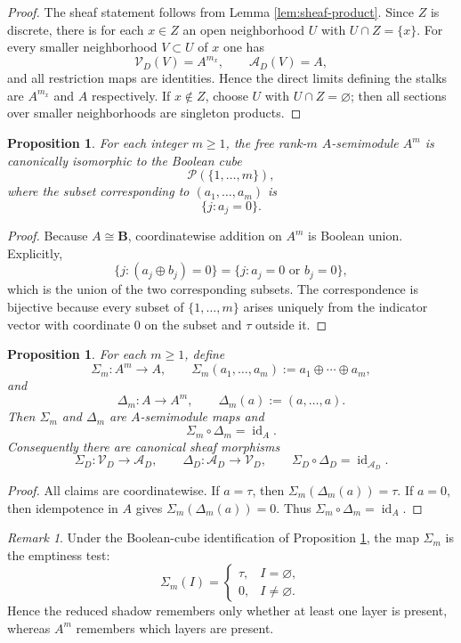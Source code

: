 \documentclass[11pt,a4paper]{article}
\newtheorem{proposition}[theorem]{Proposition}
\theoremstyle{definition}
\theoremstyle{remark}
\newtheorem{remark}[theorem]{Remark}
\newcommand{\BB}{\mathbf B}
\newcommand{\cP}{\mathcal P}
\newcommand{\taup}{\tau}
\begin{document}
\begin{proof}
The sheaf statement follows from Lemma \ref{lem:sheaf-product}.  Since $Z$ is discrete, there is for each $x\in Z$ an open neighborhood $U$ with $U\cap Z=\{x\}$.  For every smaller neighborhood $V\subset U$ of $x$ one has
\[
\mathcal V_D(V)=A^{m_x},
\qquad
\mathcal A_D(V)=A,
\]
and all restriction maps are identities.  Hence the direct limits defining the stalks are $A^{m_x}$ and $A$ respectively.  If $x\notin Z$, choose $U$ with $U\cap Z=\varnothing$; then all sections over smaller neighborhoods are singleton products.
\end{proof}

\begin{proposition}\label{prop:boolean-cube}
For each integer $m\ge1$, the free rank-$m$ $A$-semimodule $A^m$ is canonically isomorphic to the Boolean cube
\[
\cP(\{1,\dots,m\}),
\]
where the subset corresponding to $(a_1,\dots,a_m)$ is
\[
\{j:a_j=0\}.
\]
\end{proposition}

\begin{proof}
Because $A\cong\BB$, coordinatewise addition on $A^m$ is Boolean union.  Explicitly,
\[
\{j:(a_j\oplus b_j)=0\}=\{j:a_j=0\text{ or }b_j=0\},
\]
which is the union of the two corresponding subsets.  The correspondence is bijective because every subset of $\{1,\dots,m\}$ arises uniquely from the indicator vector with coordinate $0$ on the subset and $\taup$ outside it.
\end{proof}

\begin{proposition}\label{prop:retract}
For each $m\ge1$, define
\[
\Sigma_m:A^m\to A,
\qquad
\Sigma_m(a_1,\dots,a_m):=a_1\oplus\cdots\oplus a_m,
\]
and
\[
\Delta_m:A\to A^m,
\qquad
\Delta_m(a):=(a,\dots,a).
\]
Then $\Sigma_m$ and $\Delta_m$ are $A$-semimodule maps and
\[
\Sigma_m\circ \Delta_m=\operatorname{id}_A.
\]
Consequently there are canonical sheaf morphisms
\[
\Sigma_D:\mathcal V_D\to\mathcal A_D,
\qquad
\Delta_D:\mathcal A_D\to\mathcal V_D,
\qquad
\Sigma_D\circ\Delta_D=\operatorname{id}_{\mathcal A_D}.
\]
\end{proposition}

\begin{proof}
All claims are coordinatewise.  If $a=\taup$, then $\Sigma_m(\Delta_m(a))=\taup$.  If $a=0$, then idempotence in $A$ gives $\Sigma_m(\Delta_m(a))=0$.  Thus $\Sigma_m\circ\Delta_m=\operatorname{id}_A$.
\end{proof}

\begin{remark}
Under the Boolean-cube identification of Proposition \ref{prop:boolean-cube}, the map $\Sigma_m$ is the emptiness test:
\[
\Sigma_m(I)=\begin{cases}
\taup,& I=\varnothing,\\
0,& I\neq\varnothing.
\end{cases}
\]
Hence the reduced shadow remembers only whether at least one layer is present, whereas $A^m$ remembers which layers are present.
\end{remark}
\end{document}
